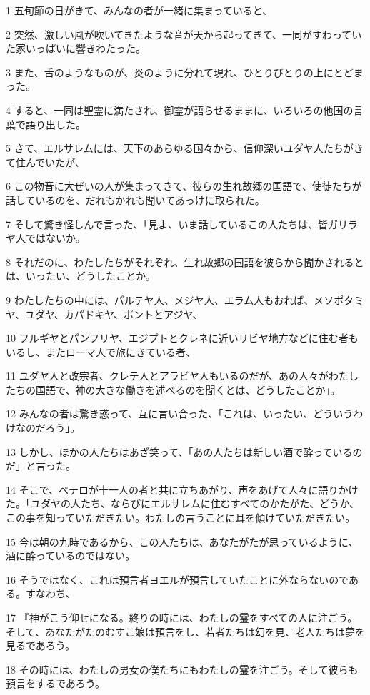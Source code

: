 \par 1 五旬節の日がきて、みんなの者が一緒に集まっていると、
\par 2 突然、激しい風が吹いてきたような音が天から起ってきて、一同がすわっていた家いっぱいに響きわたった。
\par 3 また、舌のようなものが、炎のように分れて現れ、ひとりびとりの上にとどまった。
\par 4 すると、一同は聖霊に満たされ、御霊が語らせるままに、いろいろの他国の言葉で語り出した。
\par 5 さて、エルサレムには、天下のあらゆる国々から、信仰深いユダヤ人たちがきて住んでいたが、
\par 6 この物音に大ぜいの人が集まってきて、彼らの生れ故郷の国語で、使徒たちが話しているのを、だれもかれも聞いてあっけに取られた。
\par 7 そして驚き怪しんで言った、「見よ、いま話しているこの人たちは、皆ガリラヤ人ではないか。
\par 8 それだのに、わたしたちがそれぞれ、生れ故郷の国語を彼らから聞かされるとは、いったい、どうしたことか。
\par 9 わたしたちの中には、パルテヤ人、メジヤ人、エラム人もおれば、メソポタミヤ、ユダヤ、カパドキヤ、ポントとアジヤ、
\par 10 フルギヤとパンフリヤ、エジプトとクレネに近いリビヤ地方などに住む者もいるし、またローマ人で旅にきている者、
\par 11 ユダヤ人と改宗者、クレテ人とアラビヤ人もいるのだが、あの人々がわたしたちの国語で、神の大きな働きを述べるのを聞くとは、どうしたことか」。
\par 12 みんなの者は驚き惑って、互に言い合った、「これは、いったい、どういうわけなのだろう」。
\par 13 しかし、ほかの人たちはあざ笑って、「あの人たちは新しい酒で酔っているのだ」と言った。
\par 14 そこで、ペテロが十一人の者と共に立ちあがり、声をあげて人々に語りかけた。「ユダヤの人たち、ならびにエルサレムに住むすべてのかたがた、どうか、この事を知っていただきたい。わたしの言うことに耳を傾けていただきたい。
\par 15 今は朝の九時であるから、この人たちは、あなたがたが思っているように、酒に酔っているのではない。
\par 16 そうではなく、これは預言者ヨエルが預言していたことに外ならないのである。すなわち、
\par 17 『神がこう仰せになる。終りの時には、わたしの霊をすべての人に注ごう。そして、あなたがたのむすこ娘は預言をし、若者たちは幻を見、老人たちは夢を見るであろう。
\par 18 その時には、わたしの男女の僕たちにもわたしの霊を注ごう。そして彼らも預言をするであろう。
